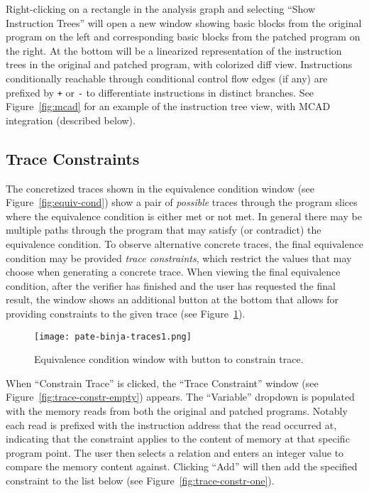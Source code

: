 Right-clicking on a rectangle in the \pate{} analysis graph and selecting ``Show Instruction Trees'' will open a new window showing basic blocks from the original program on the left and corresponding basic blocks from the patched program on the right.
At the bottom will be a linearized representation of the instruction trees in the original and patched program, with colorized diff view.
Instructions conditionally reachable through conditional control flow edges (if any) are prefixed by \texttt{+} or \texttt{-} to differentiate instructions in distinct branches.
See Figure~\ref{fig:mcad} for an example of the instruction tree view, with MCAD integration (described below).

\subsection{Trace Constraints}

The concretized traces shown in the equivalence condition window (see Figure~\ref{fig:equiv-cond}) show a pair of \emph{possible} traces
through the program slices where the equivalence condition is either met or not met. In general there may be multiple paths through
the program that may satisfy (or contradict) the equivalence condition. To observe alternative concrete traces, the final equivalence
condition may be provided \emph{trace constraints}, which restrict the values that \pate{} may choose when generating a concrete trace.
When viewing the final equivalence condition, after the verifier has finished and the user has requested the final result, the window
shows an additional button at the bottom that allows for providing constraints to the given trace (see Figure~\ref{fig:equiv-cond-full}).

\begin{figure}[h]
  \centering
  \texttt{[image: pate-binja-traces1.png]}
  \caption{Equivalence condition window with button to constrain trace.}
  \label{fig:equiv-cond-full}
\end{figure}

When ``Constrain Trace'' is clicked, the ``Trace Constraint'' window (see Figure~\ref{fig:trace-constr-empty}) appears. The
``Variable'' dropdown is populated with the memory reads from both the original and patched programs. Notably each read
is prefixed with the instruction address that the read occurred at, indicating that the constraint applies to the content
of memory at that specific program point. The user then selects a relation and enters an integer value to compare the
memory content against. Clicking ``Add'' will then add the specified constraint to the list below (see Figure~\ref{fig:trace-constr-one}).


